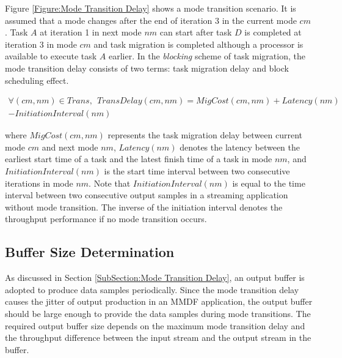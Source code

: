\documentclass[prodmode,acmtecs]{acmsmall}
\begin{document}
Figure \ref{Figure:Mode Transition Delay} shows a mode transition scenario. It is assumed that a mode changes after the end of iteration 3 in the current mode $cm$. Task $A$ at iteration 1 in next mode $nm$ can start after task $D$ is completed at iteration 3 in mode $cm$ and task migration is completed although a processor is available to execute task $A$ earlier. In the \textit{blocking} scheme of task migration, the mode transition delay consists of two terms: task migration delay and block scheduling effect.

\begin{definition}
\label{Definition:Mode Transition Delay}
\begin{equation}
\begin{split}
\forall (cm,nm) \in Trans,\:\: TransDelay(cm, nm) = MigCost(cm, nm) + Latency(nm) \\ - InitiationInterval(nm) \nonumber
\end{split}
\end{equation}
\end{definition}

where $MigCost(cm, nm)$ represents the task migration delay between current mode $cm$ and  next mode $nm$, $Latency(nm)$ denotes the latency between the earliest start time of a task and the latest finish time of a task in mode $nm$, and $InitiationInterval(nm)$ is the start time interval between two consecutive iterations in mode $nm$. Note that $InitiationInterval(nm)$ is equal to the time interval between two consecutive output samples in a streaming application without mode transition. The inverse of the initiation interval denotes the throughput performance if no mode transition occurs.

\subsection{Buffer Size Determination}
\label{SubSection:Buffer Size Determination}

As discussed in Section \ref{SubSection:Mode Transition Delay}, an output buffer is adopted to produce data samples periodically. Since the mode transition delay causes the jitter of output production in an MMDF application, the output buffer should be large enough to provide the data samples during mode transitions. The required output buffer size depends on the maximum mode transition delay and the throughput difference between the input stream and the output stream in the buffer.
\end{document}
